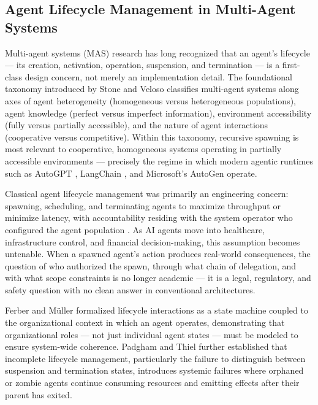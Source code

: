 \documentclass[12pt]{article}
\begin{document}
\subsection{Agent Lifecycle Management in Multi-Agent Systems}

Multi-agent systems (MAS) research has long recognized that an agent's lifecycle --- its creation, activation, operation, suspension, and termination --- is a first-class design concern, not merely an implementation detail. The foundational taxonomy introduced by Stone and Veloso \cite{stone2000} classifies multi-agent systems along axes of agent heterogeneity (homogeneous versus heterogeneous populations), agent knowledge (perfect versus imperfect information), environment accessibility (fully versus partially accessible), and the nature of agent interactions (cooperative versus competitive). Within this taxonomy, recursive spawning is most relevant to cooperative, homogeneous systems operating in partially accessible environments --- precisely the regime in which modern agentic runtimes such as AutoGPT \cite{autoGPT2023}, LangChain \cite{langchain2023}, and Microsoft's AutoGen \cite{autogen2023} operate.

Classical agent lifecycle management was primarily an engineering concern: spawning, scheduling, and terminating agents to maximize throughput or minimize latency, with accountability residing with the system operator who configured the agent population \cite{bansal2019}. As AI agents move into healthcare, infrastructure control, and financial decision-making, this assumption becomes untenable. When a spawned agent's action produces real-world consequences, the question of who authorized the spawn, through what chain of delegation, and with what scope constraints is no longer academic --- it is a legal, regulatory, and safety question with no clean answer in conventional architectures.

Ferber and M\"uller \cite{ferber1996} formalized lifecycle interactions as a state machine coupled to the organizational context in which an agent operates, demonstrating that organizational roles --- not just individual agent states --- must be modeled to ensure system-wide coherence. Padgham and Thiel \cite{padgham2001} further established that incomplete lifecycle management, particularly the failure to distinguish between suspension and termination states, introduces systemic failures where orphaned or zombie agents continue consuming resources and emitting effects after their parent has exited.
\end{document}
